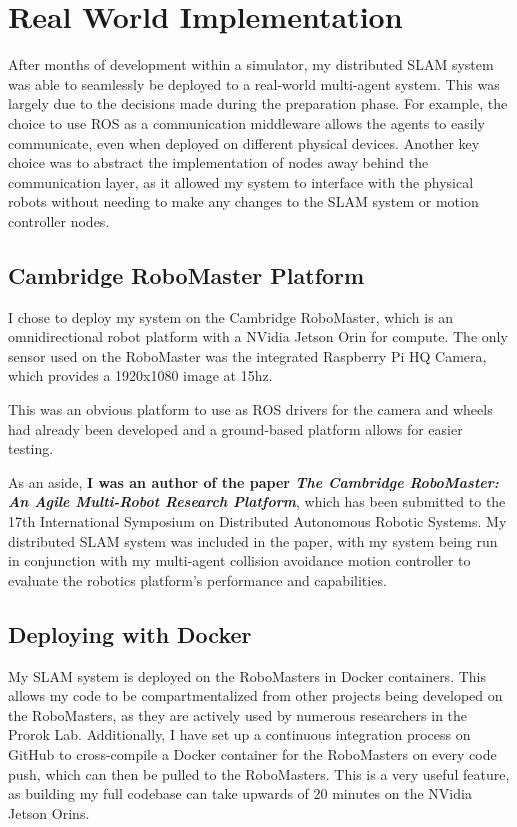 \section{Real World Implementation}
\label{sec:real-world-implementation}
After months of development within a simulator, my distributed SLAM system was able to seamlessly be deployed to a real-world multi-agent system. This was largely due to the decisions made during the preparation phase. For example, the choice to use ROS as a communication middleware allows the agents to easily communicate, even when deployed on different physical devices. Another key choice was to abstract the implementation of nodes away behind the communication layer, as it allowed my system to interface with the physical robots without needing to make any changes to the SLAM system or motion controller nodes.

\subsection{Cambridge RoboMaster Platform}
\label{sec:cambridge-robomaster-platform}
I chose to deploy my system on the Cambridge RoboMaster, which is an omnidirectional robot platform with a NVidia Jetson Orin for compute. The only sensor used on the RoboMaster was the integrated Raspberry Pi HQ Camera, which provides a 1920x1080 image at 15hz.

This was an obvious platform to use as ROS drivers for the camera and wheels had already been developed and a ground-based platform allows for easier testing.

As an aside, \textbf{I was an author of the paper \textit{The Cambridge RoboMaster: An Agile Multi-Robot Research Platform}}, which has been submitted to the 17th International Symposium on Distributed Autonomous Robotic Systems. My distributed SLAM system was included in the paper, with my system being run in conjunction with my multi-agent collision avoidance motion controller to evaluate the robotics platform's performance and capabilities.

\subsection{Deploying with Docker}
\label{sec:deploying-with-docker}
My SLAM system is deployed on the RoboMasters in Docker containers. This allows my code to be compartmentalized from other projects being developed on the RoboMasters, as they are actively used by numerous researchers in the Prorok Lab. Additionally, I have set up a continuous integration process on GitHub to cross-compile a Docker container for the RoboMasters on every code push, which can then be pulled to the RoboMasters. This is a very useful feature, as building my full codebase can take upwards of 20 minutes on the NVidia Jetson Orins.

